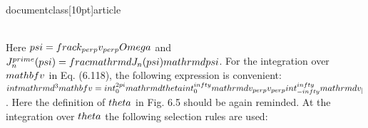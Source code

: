 \\documentclass[10pt]{article}
\begin{document}
{{{{\\[
\\begin{array}{r}
J_{n-1}(\\psi)+J_{n+1}(\\psi)=\\frac{2 n}{\\psi} J_{n}(\\psi) \\\\
J_{n-1}(\\psi)-J_{n+1}(\\psi)=2 J_{n}^{\\prime}(\\psi) \\tag{6.139}
\\end{array}
\\]

Here $\\psi=\\frac{k_{\\perp} v_{\\perp}}{\\Omega}$ and $J_{n}^{\\prime}(\\psi)=\\frac{\\mathrm{d} J_{n}(\\psi)}{\\mathrm{d} \\psi}$. For the integration over $\\mathbf{v}$ in Eq. (6.118), the following expression is convenient: $\\int \\mathrm{d}^{3} \\mathbf{v}=\\int_{0}^{2 \\pi} \\mathrm{d} \\theta \\int_{0}^{\\infty} \\mathrm{d} v_{\\perp} v_{\\perp} \\int_{-\\infty}^{\\infty} \\mathrm{d} v_{\\|}$. Here the definition of $\\theta$ in Fig. 6.5 should be again reminded. At the integration over $\\theta$ the following selection rules are used:

}}}}
\end{document}
